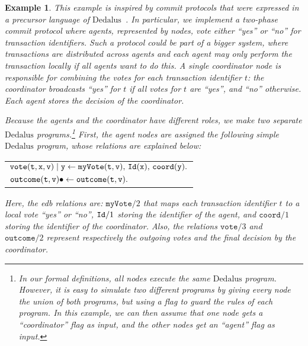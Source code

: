 \documentclass{tlp}
\newtheorem{example}[theorem]{Example}
\newenvironment{cenchop}{\renewcommand{\arraystretch}{1.3}\begin{center}\begin{tabular}{l}}{\end{tabular}\end{center}\renewcommand{\arraystretch}{1}}
\newcommand{\qsp}{\\[1.2ex]}
\newcommand{\langname}[1]{\text{#1}}  \newcommand{\pred}[1]{\mathtt{#1}}  \newcommand{\fname}[1]{\mathit{#1}}  \newcommand{\sq}[1]{`{#1}'}
\newcommand{\dedalus}{\langname{Dedalus}}
\newcommand{\rar}[2]{#1/#2}
\newcommand{\var}[1]{\mathtt{#1}}
\begin{document}
\begin{example}
    \label{ex:2pc}
    This example is inspired by commit protocols that were expressed in a precursor language of $\dedalus$~\cite{i-do-declare}. 
    In particular, we implement a two-phase commit protocol where agents, represented by nodes, vote either ``yes'' or ``no'' for transaction identifiers. 
    Such a protocol could be part of a bigger system, where transactions are distributed across agents and each agent may only perform the transaction locally if \emph{all} agents want to do this. 
    A single \emph{coordinator} node is responsible for combining the votes for each transaction identifier $t$: the coordinator broadcasts ``yes'' for $t$ if all votes for $t$ are ``yes'', and ``no'' otherwise. 
    Each agent stores the decision of the coordinator.
    
    Because the agents and the coordinator have different roles, we make two separate $\dedalus$ programs.\footnote{In our formal definitions, all nodes execute the same $\dedalus$ program. However, it is easy to simulate two different programs by giving every node the union of both programs, but using a flag to guard the rules of each program. In this example, we can then assume that one node gets a ``coordinator'' flag as input, and the other nodes get an ``agent'' flag as input.}
    First, the agent nodes are assigned the following simple $\dedalus$ program, whose relations are explained below:
    \begin{cenchop}
    $\pred{vote}(\var t,\var x,\var v)\sugas\var y\gets \pred{myVote}(\var t,\var v),\,\relid(\var x),\,\pred{coord}(\var y).$
    \qsp
    $\pred{outcome}(\var t,\var v)\sugind\gets\pred{outcome}(\var t,\var v).$
    \end{cenchop}
    Here, the \emph{edb} relations are: $\rar{\pred{myVote}}2$ that maps each transaction identifier $t$ to a local vote ``yes'' or ``no'', $\rar{\relid}1$ storing the identifier of the agent, and $\rar{\pred{coord}}1$ storing the identifier of the coordinator.
    Also, the relations $\rar{\pred{vote}}3$ and $\rar{\pred{outcome}}2$ represent respectively the outgoing votes and the final decision by the coordinator.
    

\end{example}
\end{document}
